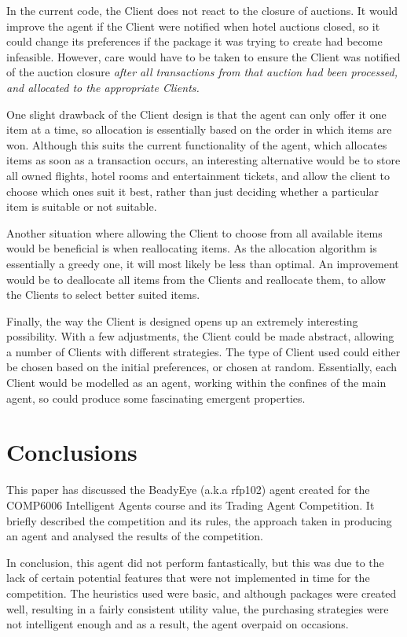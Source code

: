\documentclass{acm_proc_article-sp}
\begin{document}
 In the current code, the Client does not react to the closure of auctions.  It would improve the agent if the Client were notified when hotel auctions closed, so it could change its preferences if the package it was trying to create had become infeasible.  However, care would have to be taken to ensure the Client was notified of the auction closure \em after \em all transactions from that auction had been processed, and allocated to the appropriate Clients.
  
 One slight drawback of the Client design is that the agent can only offer it one item at a time, so allocation is essentially based on the order in which items are won.  Although this suits the current functionality of the agent, which allocates items as soon as a transaction occurs, an interesting alternative would be to store all owned flights, hotel rooms and entertainment tickets, and allow the client to choose which ones suit it best, rather than just deciding whether a particular item is suitable or not suitable.
 
 Another situation where allowing the Client to choose from all available items would be beneficial is when reallocating items.  As the allocation algorithm is essentially a greedy one, it will most likely be less than optimal.  An improvement would be to deallocate all items from the Clients and reallocate them, to allow the Clients to select better suited items.
 
 Finally, the way the Client is designed opens up an extremely interesting possibility.  With a few adjustments, the Client could be made abstract, allowing a number of Clients with different strategies.  The type of Client used could either be chosen based on the initial preferences, or chosen at random.  Essentially, each Client would be modelled as an agent, working within the confines of the main agent, so could produce some fascinating emergent properties.

\section{Conclusions}
 \label{conc}
 This paper has discussed the BeadyEye (a.k.a rfp102) agent created for the COMP6006 Intelligent Agents course and its Trading Agent Competition.  It briefly described the competition and its rules, the approach taken in producing an agent and analysed the results of the competition.
 
 In conclusion, this agent did not perform fantastically, but this was due to the lack of certain potential features that were not implemented in time for the competition.  The heuristics used were basic, and although packages were created well, resulting in a fairly consistent utility value, the purchasing strategies were not intelligent enough and as a result, the agent overpaid on occasions.
 
\end{document}
